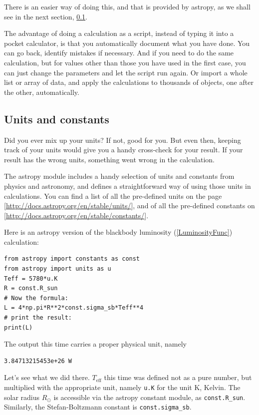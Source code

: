 \documentclass[twocolumn,apj]{openjournal}
\begin{document}
There is an easier way of doing this, and that is provided by astropy, as we shall see in the next section, \ref{UnitsConstants}.

The advantage of doing a calculation as a script, instead of typing it into a pocket calculator, is that you automatically document what you have done. You can go back, identify mistakes if necessary. And if you need to do the same calculation, but for values other than those you have used in the first case, you can just change the parameters and let the script run again. Or import a whole list or array of data, and apply the calculations to thousands of objects, one after the other, automatically. 

\subsection{Units and constants}
\label{UnitsConstants}
Did you ever mix up your units? If not, good for you. But even then, keeping track of your units would give you a handy cross-check for your result. If your result has the wrong units, something went wrong in the calculation.

The astropy module includes a handy selection of units and constants from physics and astronomy, and defines a straightforward way of using those units in calculations.  You can find a list of all the pre-defined units on the page [\href{http://docs.astropy.org/en/stable/units/}{http://docs.astropy.org/en/stable/units/}],
and of all the pre-defined constants on [\href{http://docs.astropy.org/en/stable/constants/}{http://docs.astropy.org/en/stable/constants/}].

Here is an astropy version of the blackbody luminosity (\ref{LuminosityFunc}) calculation:
\begin{lstlisting}
from astropy import constants as const
from astropy import units as u
Teff = 5780*u.K
R = const.R_sun
# Now the formula:
L = 4*np.pi*R**2*const.sigma_sb*Teff**4
# print the result:
print(L)
\end{lstlisting}
The output this time carries a proper physical unit, namely
\begin{lstlisting}
3.84713215453e+26 W
\end{lstlisting}
Let's see what we did there. $T_{\mathrm{eff}}$ this time was defined not as a pure number, but multiplied with the appropriate unit, namely \verb|u.K| for the unit K, Kelvin. The solar radius $R_{\odot}$ is accessible via the astropy constant module, as \verb|const.R_sun|. Similarly, the Stefan-Boltzmann constant is \verb|const.sigma_sb|.
\end{document}
